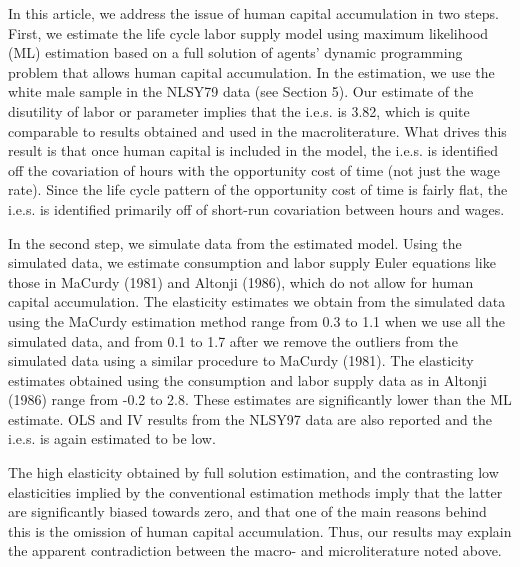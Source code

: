 \documentclass{article}
\begin{document}

In this article, we address the issue of human capital accumulation in two steps. First, we estimate the life cycle labor supply model using maximum likelihood (ML) estimation based on a full solution of agents' dynamic programming problem that allows human capital accumulation. In the estimation, we use the white male sample in the NLSY79 data (see Section 5). Our estimate of the disutility of labor or parameter implies that the i.e.s. is 3.82, which is quite comparable to results obtained and used in the macroliterature. What drives this result is that once human capital is included in the model, the i.e.s. is identified off the covariation of hours with the opportunity cost of time (not just the wage rate). Since the life cycle pattern of the opportunity cost of time is fairly flat, the i.e.s. is identified primarily off of short-run covariation between hours and wages. \par
In the second step, we simulate data from the estimated model. Using the simulated data, we estimate consumption and labor supply Euler equations like those in MaCurdy (1981) and Altonji (1986), which do not allow for human capital accumulation. The elasticity estimates we obtain from the simulated data using the MaCurdy estimation method range from 0.3 to 1.1 when we use all the simulated data, and from 0.1 to 1.7 after we remove the outliers from the simulated data using a similar procedure to MaCurdy (1981). The elasticity estimates obtained using the consumption and labor supply data as in Altonji (1986) range from -0.2 to 2.8. These estimates are significantly lower than the ML estimate. OLS and IV results from the NLSY97 data are also reported and the i.e.s. is again estimated to be low. \par
The high elasticity obtained by full solution estimation, and the contrasting low elasticities implied by the conventional estimation methods imply that the latter are significantly biased towards zero, and that one of the main reasons behind this is the omission of human capital accumulation. Thus, our results may explain the apparent contradiction between the macro- and microliterature noted above. \par
\end{document}
